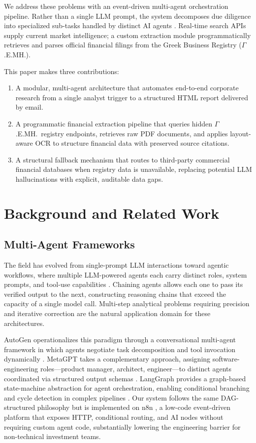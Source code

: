 \documentclass[12pt]{article}
\begin{document}
We address these problems with an event-driven multi-agent orchestration pipeline. Rather than a
single LLM prompt, the system decomposes due diligence into specialized sub-tasks handled by
distinct AI agents \parencite{xi2023rise}. Real-time search APIs supply current market
intelligence; a custom extraction module programmatically retrieves and parses official financial
filings from the Greek Business Registry ($\Gamma$.E.MH.).

This paper makes three contributions:
\begin{enumerate}
  \item A modular, multi-agent architecture that automates end-to-end corporate research from a
        single analyst trigger to a structured HTML report delivered by email.
  \item A programmatic financial extraction pipeline that queries hidden $\Gamma$.E.MH.\ registry
        endpoints, retrieves raw PDF documents, and applies layout-aware OCR to structure
        financial data with preserved source citations.
  \item A structural fallback mechanism that routes to third-party commercial financial databases when
        registry data is unavailable, replacing potential LLM hallucinations with explicit,
        auditable data gaps.
\end{enumerate}

\section{Background and Related Work}
\label{sec:background}

\subsection{Multi-Agent Frameworks}

The field has evolved from single-prompt LLM interactions toward agentic workflows, where multiple
LLM-powered agents each carry distinct roles, system prompts, and tool-use capabilities
\parencite{xi2023rise}. Chaining agents allows each one to pass its verified output to the next,
constructing reasoning chains that exceed the capacity of a single model call. Multi-step
analytical problems requiring precision and iterative correction are the natural application
domain for these architectures.

AutoGen operationalizes this paradigm through a conversational multi-agent framework in which
agents negotiate task decomposition and tool invocation dynamically \parencite{wu2023autogen}.
MetaGPT takes a complementary approach, assigning software-engineering roles---product manager,
architect, engineer---to distinct agents coordinated via structured output schemas
\parencite{hong2023metagpt}. LangGraph provides a graph-based state-machine abstraction for agent
orchestration, enabling conditional branching and cycle detection in complex pipelines
\parencite{langgraph2024}. Our system follows the same DAG-structured philosophy but is
implemented on n8n \parencite{n8n2024}, a low-code event-driven platform that exposes HTTP,
conditional routing, and AI nodes without requiring custom agent code, substantially lowering the
engineering barrier for non-technical investment teams.
\end{document}
